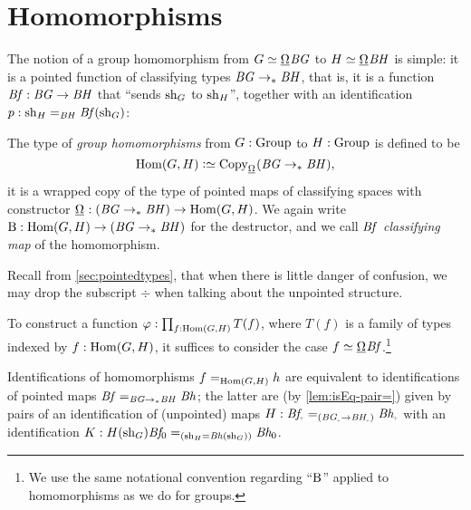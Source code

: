 \section{Homomorphisms}
\label{sec:homomorphisms}

The notion of a group homomorphism from $G\jdeq\mkgroup\BG$ to $H\jdeq\mkgroup\BH$
is simple:
it is a pointed function of classifying types $\mathit{B}\mathit{G}\to_\ast\mathit{B}\mathit{H}$, that is, it is a function
$\mathit{B}\mathit{f} :\mathit{B}\mathit{G}\to\mathit{B}\mathit{H}$ that ``sends $\mathrm{sh}_G$ to $\mathrm{sh}_H$'',
\ie together with an identification $p:\mathrm{sh}_H=_{\mathit{B}\mathit{H}}\mathit{B}\mathit{f}(\mathrm{sh}_G)$:
\begin{definition}\label{def:grouphomomorphism}
  The type of \emph{group homomorphisms} from $G:\mathrm{Group}$ to
  $H:\mathrm{Group}$ is defined to be
  \[
    \Hom(G,H)\defequi\Copy_{\mkgroup}(\BG\ptdto\BH),
  \]
  \ie it is a wrapped copy of the type of pointed maps of classifying spaces
  with constructor
  $\mkhom : (\BG \ptdto \BH) \to \Hom(G,H)$.
  We again write $\B : \Hom(G,H) \to (\BG \ptdto \BH)$ for the destructor,
  and we call $\mathit{B}\mathit{f}$ \emph{classifying map} of the homomorphism.
\end{definition}
Recall from \cref{sec:pointedtypes},
that when there is little danger of confusion, we may drop the subscript
$\div$ when talking about the unpointed structure.
\begin{remark}\label{rem:Bf-convention}
  To construct a function $\varphi : \prod_{f:\Hom(G,H)}T(f)$,
  where $T(f)$ is a family of types indexed by $f:\Hom(G,H)$,
  it suffices to consider the case $f \jdeq \mkhom\Bf$.\footnote{%
    We use the same notational convention regarding ``$\mathrm{B}$''
    applied to homomorphisms as we do for groups.}

  Identifications of homomorphisms $f=_{\Hom(G,H)}h$
  are equivalent to identifications of pointed maps
  $\mathit{B}\mathit{f} =_{\mathit{B}\mathit{G}\to_\ast\mathit{B}\mathit{H}} \mathit{B}\mathit{h}$;
  the latter are (by \cref{lem:isEq-pair=}) given by
  pairs of an identification of (unpointed) maps
  $H : \Bf_\div =_{(\BG_\div \to \BH_\div)} \Bh_\div$ with an identification
  $K : H(\mathrm{sh}_G)\mathit{B}\mathit{f}_0 =_{(\mathrm{sh}_H=\mathit{B}\mathit{h}(\mathrm{sh}_G))} \mathit{B}\mathit{h}_0$.
\end{remark}

